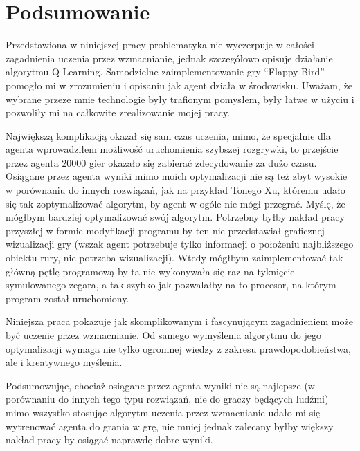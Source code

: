 \documentclass[a4paper, 12pt,oneside]{book}
\newcommand\chap[1]{%
  \chapter*{#1}%
  \addcontentsline{toc}{chapter}{#1}}
\begin{document}
\chap{Podsumowanie}
Przedstawiona w niniejszej pracy problematyka nie wyczerpuje w całości
zagadnienia uczenia przez wzmacnianie, jednak szczegółowo opisuje działanie
algorytmu Q-Learning. Samodzielne zaimplementowanie gry ``Flappy Bird'' pomogło
mi w zrozumieniu i opisaniu jak agent działa w środowisku. Uważam, że wybrane
przeze mnie technologie były trafionym pomysłem, były łatwe w użyciu i
pozwoliły mi na całkowite zrealizowanie mojej pracy.

Największą komplikacją okazał się sam czas uczenia, mimo, że specjalnie dla 
agenta wprowadziłem możliwość uruchomienia szybszej rozgrywki, to przejście
przez agenta $20000$ gier okazało się zabierać zdecydowanie za dużo czasu.
Osiągane przez agenta wyniki mimo moich optymalizacji nie są też zbyt wysokie w
porównaniu do innych rozwiązań, jak na przykład Tonego Xu, któremu udało się
tak zoptymalizować algorytm, by agent w ogóle nie mógł
przegrać\cite{tds_rl_score}. Myślę, że mógłbym bardziej optymalizować swój
algorytm. Potrzebny byłby nakład pracy przyszłej w formie modyfikacji programu
by ten nie przedstawiał graficznej wizualizacji gry (wszak agent potrzebuje
tylko informacji o położeniu najbliższego obiektu rury, nie potrzeba
wizualizacji). Wtedy mógłbym zaimplementować tak główną pętlę programową by ta
nie wykonywała się raz na tyknięcie symulowanego zegara, a tak szybko jak
pozwalałby na to procesor, na którym program został uruchomiony.
	
Niniejsza praca pokazuje jak skomplikowanym i fascynującym zagadnieniem może
być uczenie przez wzmacnianie. Od samego wymyślenia algorytmu do jego
optymalizacji wymaga nie tylko ogromnej wiedzy z zakresu prawdopodobieństwa,
ale i kreatywnego myślenia.

Podsumowując, chociaż osiągane przez agenta wyniki nie są najlepsze (w
porównaniu do innych tego typu rozwiązań, nie do graczy będących ludźmi)
mimo wszystko stosując algorytm uczenia przez wzmacnianie udało mi się
wytrenować agenta do grania w grę, nie mniej jednak zalecany byłby większy
nakład pracy by osiągać naprawdę dobre wyniki.


%
%



\end{document}
